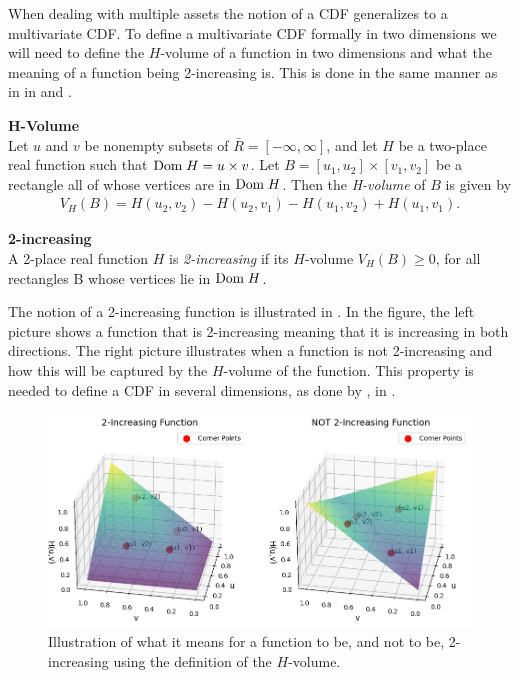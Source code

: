When dealing with multiple assets the notion of a \gls{CDF} generalizes to a multivariate \gls{CDF}. To define a multivariate \gls{CDF} formally in two dimensions we will need to define the $H$-volume of a function in two dimensions and what the meaning of a function being 2-increasing is. This is done in the same manner as in \citet[p.~8]{Nelsen2006} in  and .

\begin{definition}\label{def:H-volume} \textbf{H-Volume} \citet[p.~8]{Nelsen2006}\\
    Let $u$ and $v$ be nonempty subsets of $\bar{R} = [-\infty, \infty]$, and let $H$ be a two-place real function such that $\mathrm{Dom \;} H = u\times v$. Let $B = [u_1,u_2]\times[v_1,v_2]$  be a rectangle all of whose vertices are in $\mathrm{Dom \;} H$. Then
    the \emph{H-volume} of $B$ is given by
    \begin{align*}
        V_H(B) = H(u_2,v_2) - H(u_2,v_1) - H(u_1,v_2) + H(u_1,v_1).
    \end{align*}
\end{definition}

\begin{definition}\label{def:2-Increasing} \textbf{2-increasing} \citet[p.~8]{Nelsen2006}\\
     A 2-place real function $H$ is \emph{2-increasing} if its $H$-volume $V_H(B)\geq0$, for all rectangles B whose vertices lie in $\mathrm{Dom \;} H$.
\end{definition}

The notion of a 2-increasing function is illustrated in . In the figure, the left picture shows a function that is 2-increasing meaning that it is increasing in both directions. The right picture illustrates when a function is not 2-increasing and how this will be captured by the $H$-volume of the function. This property is needed to define a \gls{CDF} in several dimensions, as done by \citet[p.~17]{Nelsen2006}, in . 

\begin{figure}
    \centering
    \includegraphics[width=1\linewidth]{3Theory/pictures/2increasingAndNot.png}
    \caption{Illustration of what it means for a function to be, and not to be, 2-increasing using the definition of the $H$-volume.}
    \label{fig:2-Increasing}
\end{figure}



